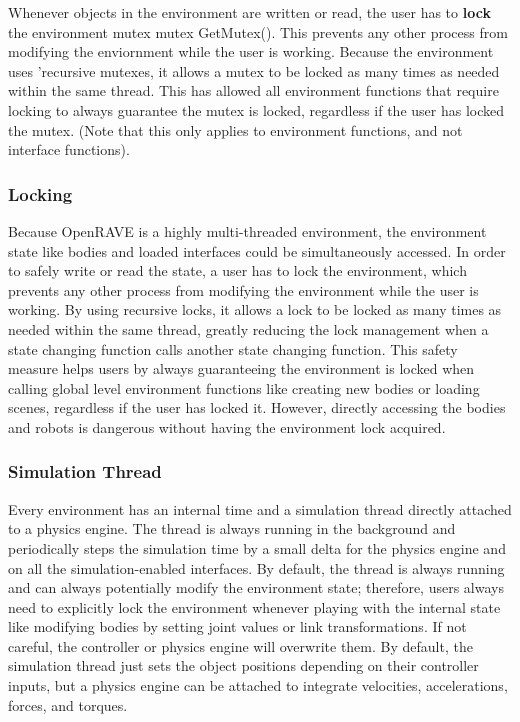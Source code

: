Whenever objects in the environment are written or read, the user has to {\bfseries lock} the environment mutex mutex GetMutex(). This prevents any other process from modifying the enviornment while the user is working. Because the environment uses 'recursive mutexes, it allows a mutex to be locked as many times as needed within the same thread. This has allowed all environment functions that require locking to always guarantee the mutex is locked, regardless if the user has locked the mutex. (Note that this only applies to environment functions, and not interface functions).\hypertarget{architecture__concepts_arch_locking}{}\subsubsection{Locking}\label{architecture__concepts_arch_locking}
Because OpenRAVE is a highly multi-\/threaded environment, the environment state like bodies and loaded interfaces could be simultaneously accessed. In order to safely write or read the state, a user has to lock the environment, which prevents any other process from modifying the environment while the user is working. By using recursive locks, it allows a lock to be locked as many times as needed within the same thread, greatly reducing the lock management when a state changing function calls another state changing function. This safety measure helps users by always guaranteeing the environment is locked when calling global level environment functions like creating new bodies or loading scenes, regardless if the user has locked it. However, directly accessing the bodies and robots is dangerous without having the environment lock acquired.\hypertarget{architecture__concepts_arch_simulation}{}\subsubsection{Simulation Thread}\label{architecture__concepts_arch_simulation}
Every environment has an internal time and a simulation thread directly attached to a physics engine. The thread is always running in the background and periodically steps the simulation time by a small delta for the physics engine and on all the simulation-\/enabled interfaces. By default, the thread is always running and can always potentially modify the environment state; therefore, users always need to explicitly lock the environment whenever playing with the internal state like modifying bodies by setting joint values or link transformations. If not careful, the controller or physics engine will overwrite them. By default, the simulation thread just sets the object positions depending on their controller inputs, but a physics engine can be attached to integrate velocities, accelerations, forces, and torques.

